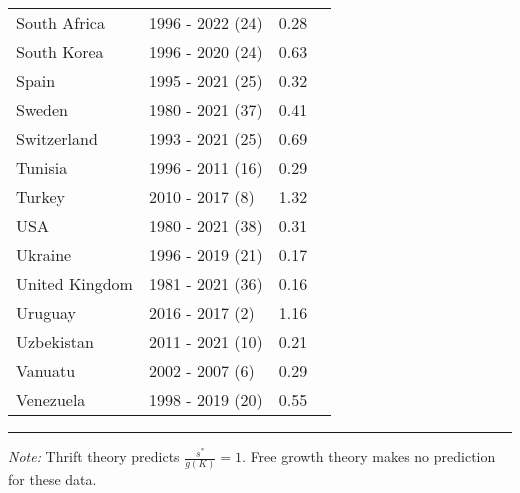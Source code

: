 \begin{table}[pos=h]
{{\begin{tabular}{llrr}
South Africa & 1996 - 2022 (24) & 0.28\\
South Korea & 1996 - 2020 (24) & 0.63\\
Spain & 1995 - 2021 (25) & 0.32\\
\addlinespace
Sweden & 1980 - 2021 (37) & 0.41\\
Switzerland & 1993 - 2021 (25) & 0.69\\
Tunisia & 1996 - 2011 (16) & 0.29\\
Turkey & 2010 - 2017 (8) & 1.32\\
USA & 1980 - 2021 (38) & 0.31\\
\addlinespace
Ukraine & 1996 - 2019 (21) & 0.17\\
United Kingdom & 1981 - 2021 (36) & 0.16\\
Uruguay & 2016 - 2017 (2) & 1.16\\
Uzbekistan & 2011 - 2021 (10) & 0.21\\
Vanuatu & 2002 - 2007 (6) & 0.29\\
\addlinespace
Venezuela & 1998 - 2019 (20) & 0.55\\ \end{tabular}

}
}
\hrule
\begin{flushleft}
\footnotesize \emph{Note:} Thrift theory predicts \(\frac{s^*}{g(K)} = 1\). Free growth theory makes no prediction for these data.
\end{flushleft}
\end{table}
